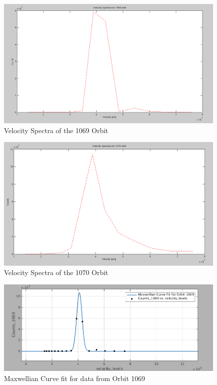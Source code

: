 \documentclass{article}
\begin{document}
\begin{figure}[!htb]
\centering
\includegraphics[scale=0.35]{Figures/velocity_spectra_1069.png}
\caption{Velocity Spectra of the 1069 Orbit}
\label{fig:Velocity_spectra_1069}
\end{figure}

\begin{figure}[htb!]
\centering
\includegraphics[scale=0.35]{Figures/velocity_spectra_1070.png}
\caption{Velocity Spectra of the 1070 Orbit}
\label{fig:Velocity_spectra_1070}
\end{figure}

\begin{figure}[!htb]
\centering
\includegraphics[scale=0.45]{Figures/curvefit_1069.png}
\caption{Maxwellian Curve fit for data from Orbit 1069}
\label{fig:curvefit_1069}
\end{figure}
\end{document}
